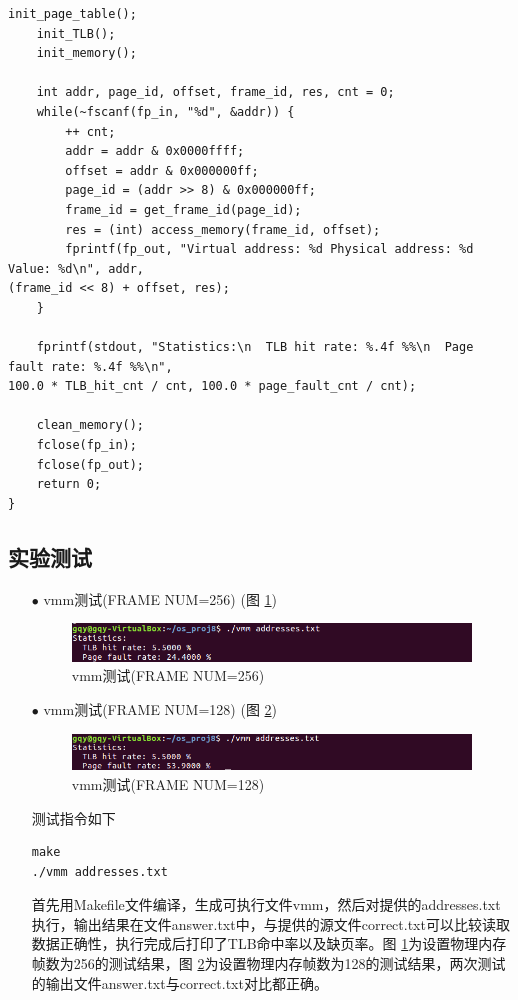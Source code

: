 \documentclass{article}
\begin{document}
\begin{lstlisting}[language={[ANSI]C}]
	init_page_table();
	init_TLB();
	init_memory();
		
	int addr, page_id, offset, frame_id, res, cnt = 0;
	while(~fscanf(fp_in, "%d", &addr)) {
		++ cnt;
		addr = addr & 0x0000ffff;
		offset = addr & 0x000000ff;
		page_id = (addr >> 8) & 0x000000ff;
		frame_id = get_frame_id(page_id);
		res = (int) access_memory(frame_id, offset);
		fprintf(fp_out, "Virtual address: %d Physical address: %d Value: %d\n", addr, 
(frame_id << 8) + offset, res);
	}
	
	fprintf(stdout, "Statistics:\n  TLB hit rate: %.4f %%\n  Page fault rate: %.4f %%\n", 
100.0 * TLB_hit_cnt / cnt, 100.0 * page_fault_cnt / cnt);
	
	clean_memory();
	fclose(fp_in);
	fclose(fp_out);
	return 0;
}
\end{lstlisting}
\subsection{实验测试}
\begin{itemize}
\item[$\bullet$]vmm测试(FRAME NUM=256) (图 \ref{vmm测试(FRAME NUM=256)})
\begin{figure}[htbp]
		\centering
		\includegraphics{vmm256}
		\caption{vmm测试(FRAME NUM=256)} \label{vmm测试(FRAME NUM=256)}
\end{figure}
\item[$\bullet$]vmm测试(FRAME NUM=128) (图 \ref{vmm测试(FRAME NUM=128)})
\begin{figure}[htbp]
		\centering
		\includegraphics{vmm128}
		\caption{vmm测试(FRAME NUM=128)} \label{vmm测试(FRAME NUM=128)}
\end{figure}

测试指令如下
\begin{lstlisting}[language={[ANSI]C}]
make
./vmm addresses.txt
\end{lstlisting}
首先用Makefile文件编译，生成可执行文件vmm，然后对提供的addresses.txt执行，输出结果在文件answer.txt中，与提供的源文件correct.txt可以比较读取数据正确性，执行完成后打印了TLB命中率以及缺页率。图 \ref{vmm测试(FRAME NUM=256)}为设置物理内存帧数为256的测试结果，图 \ref{vmm测试(FRAME NUM=128)}为设置物理内存帧数为128的测试结果，两次测试的输出文件answer.txt与correct.txt对比都正确。
\end{itemize}
\end{document}

